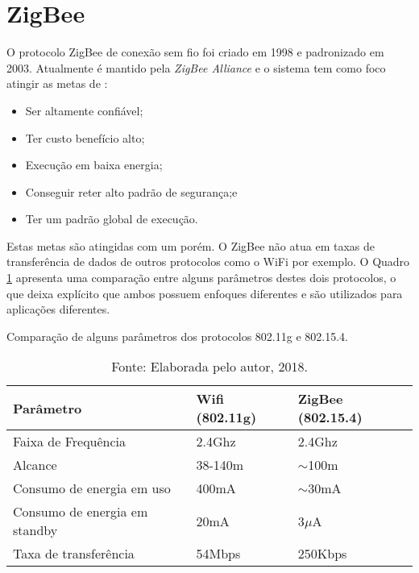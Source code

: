\section{ZigBee}
\label{sec:zigbee}
 O protocolo ZigBee de conexão sem fio foi criado em 1998 e padronizado em 2003. Atualmente é mantido pela \textit{ZigBee Alliance}\cite{zb} e o sistema tem como foco atingir as metas de \cite{gislason2008zigbee}:

 \begin{itemize}
 	\item Ser altamente confiável;
 	\item Ter custo benefício alto;
 	\item Execução em baixa energia;
 	\item Conseguir reter alto padrão de segurança;e
 	\item Ter um padrão global de execução.
 \end{itemize}

Estas metas são atingidas com um porém. O ZigBee não atua em taxas de transferência de dados de outros protocolos como o WiFi por exemplo. O Quadro \ref{tab:protocolscomparition} apresenta uma comparação entre alguns parâmetros destes dois protocolos, o que deixa explícito que ambos possuem enfoques diferentes e são utilizados para aplicações diferentes.

\begin{table}[!htb]
\centering
\caption{Comparação de alguns parâmetros dos protocolos 802.11g e 802.15.4.}
\label{tab:protocolscomparition}
\begin{tabular}{|l|l|l|}
\hline
\rowcolor[HTML]{C0C0C0} 
\textbf{Parâmetro}            & \textbf{Wifi (802.11g)} & \textbf{ZigBee (802.15.4)} \\ \hline
Faixa de Frequência           & 2.4Ghz                  & 2.4Ghz                     \\ \hline
Alcance                       & 38-140m                 & $\sim$100m                 \\ \hline
Consumo de energia em uso     & 400mA                   & $\sim$30mA                 \\ \hline
Consumo de energia em standby & 20mA                    & 3$\mu$A                        \\ \hline
Taxa de transferência         & 54Mbps                  & 250Kbps                    \\ \hline
\end{tabular}
\caption*{Fonte: Elaborada pelo autor, 2018.}
\end{table}

